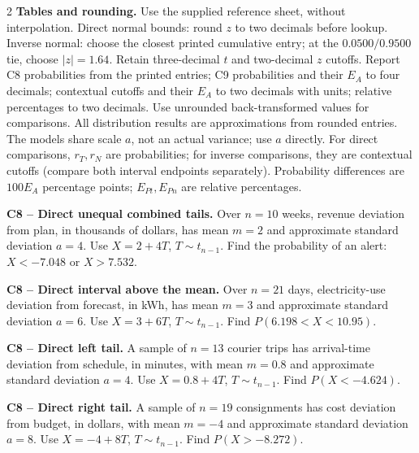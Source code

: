 \begin{multicols}{2}
\textbf{Tables and rounding.} Use the supplied reference sheet, without interpolation.
Direct normal bounds: round $z$ to two decimals before lookup.
Inverse normal: choose the closest printed cumulative entry; at the
$0.0500/0.9500$ tie, choose $|z|=1.64$.
Retain three-decimal $t$ and two-decimal $z$ cutoffs.
Report C8 probabilities from the printed entries; C9 probabilities and their
$E_A$ to four decimals; contextual cutoffs and their $E_A$ to two decimals
with units; relative percentages to two decimals.
Use unrounded back-transformed values for comparisons.
All distribution results are approximations from rounded entries.
The models share scale $a$, not an actual variance; use $a$ directly.
For direct comparisons, $r_T,r_N$ are probabilities; for inverse comparisons,
they are contextual cutoffs (compare both interval endpoints separately).
Probability differences are $100E_A$ percentage points; $E_{Pt},E_{Pn}$
are relative percentages.

\noindent\begin{minipage}{\linewidth}
\textbf{C8 -- Direct unequal combined tails.} Over $n=10$ weeks, revenue deviation from plan, in thousands of dollars, has mean $m=2$ and approximate standard deviation $a=4$. Use $X=2+4T$, $T\sim t_{n-1}$.
Find the probability of an alert: $X<-7.048$ or $X>7.532$. 
\end{minipage}\par

\noindent\begin{minipage}{\linewidth}
\textbf{C8 -- Direct interval above the mean.} Over $n=21$ days, electricity-use deviation from forecast, in kWh, has mean $m=3$ and approximate standard deviation $a=6$. Use $X=3+6T$, $T\sim t_{n-1}$.
Find $P(6.198<X<10.95)$. 
\end{minipage}\par

\noindent\begin{minipage}{\linewidth}
\textbf{C8 -- Direct left tail.} A sample of $n=13$ courier trips has arrival-time deviation from schedule, in minutes, with mean $m=0.8$ and approximate standard deviation $a=4$. Use $X=0.8+4T$, $T\sim t_{n-1}$.
Find $P(X<-4.624)$. 
\end{minipage}\par

\noindent\begin{minipage}{\linewidth}
\textbf{C8 -- Direct right tail.} A sample of $n=19$ consignments has cost deviation from budget, in dollars, with mean $m=-4$ and approximate standard deviation $a=8$. Use $X=-4+8T$, $T\sim t_{n-1}$.
Find $P(X>-8.272)$. 
\end{minipage}\par


\end{multicols}
